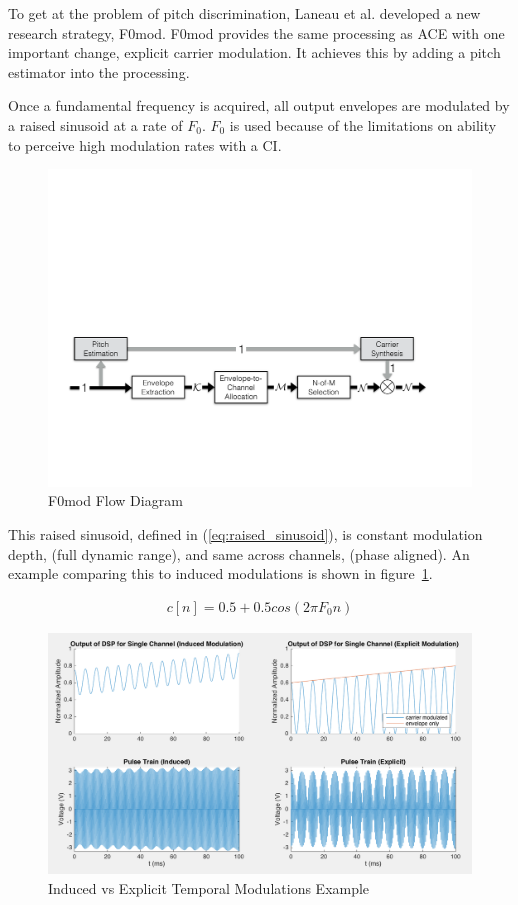 \documentclass [11pt, proquest,oneside] {ganter_thesis}[2015/03/03]
\begin{document}
To get at the problem of pitch discrimination, Laneau et al. \cite{laneau2006improved} developed a new research strategy, F0mod.  F0mod provides the same processing as ACE with one important change, explicit carrier modulation.  It achieves this by adding a pitch estimator into the processing.

Once a fundamental frequency is acquired, all output envelopes are modulated by a raised sinusoid at a rate of $F_0$.  $F_0$ is used because of the limitations on ability to perceive high modulation rates with a CI.

\begin{figure}[!ht]
  \centering
    \includegraphics[width=1\textwidth]{F0mod_flow_diagram}   
    \caption{F0mod Flow Diagram}
\end{figure}

This raised sinusoid, defined in (\ref{eq:raised_sinusoid}), is constant modulation depth, (full dynamic range), and same across channels, (phase aligned).  An example comparing this to induced modulations is shown in figure~\ref{fig:induced_vs_explicit}.

\begin{align}
\label{eq:raised_sinusoid}
c[n] = 0.5 + 0.5cos(2\pi F_0n)
\end{align}

\begin{figure}[!ht]
  \centering
    \includegraphics[width=1\textwidth]{induced_vs_explicit}   
    \caption{Induced vs Explicit Temporal Modulations Example}\label{fig:induced_vs_explicit}
\end{figure}
\end{document}
